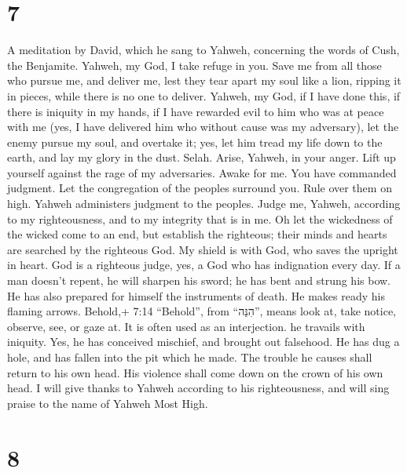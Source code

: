 \hypertarget{section-6}{%
\section{7}\label{section-6}}

A meditation by David, which he sang to Yahweh, concerning the words of
Cush, the Benjamite.  Yahweh, my God, I take refuge in you.
Save me from all those who pursue me, and deliver me,  lest
they tear apart my soul like a lion, ripping it in pieces, while there
is no one to deliver.  Yahweh, my God, if I have done this,
if there is iniquity in my hands,  if I have rewarded evil
to him who was at peace with me (yes, I have delivered him who without
cause was my adversary),  let the enemy pursue my soul, and
overtake it; yes, let him tread my life down to the earth, and lay my
glory in the dust. Selah.  Arise, Yahweh, in your anger.
Lift up yourself against the rage of my adversaries. Awake for me. You
have commanded judgment.  Let the congregation of the
peoples surround you. Rule over them on high.  Yahweh
administers judgment to the peoples. Judge me, Yahweh, according to my
righteousness, and to my integrity that is in me.  Oh let
the wickedness of the wicked come to an end, but establish the
righteous; their minds and hearts are searched by the righteous God.
 My shield is with God, who saves the upright in heart.
 God is a righteous judge, yes, a God who has indignation
every day.  If a man doesn't repent, he will sharpen his
sword; he has bent and strung his bow.  He has also
prepared for himself the instruments of death. He makes ready his
flaming arrows.  Behold,+ 7:14 ``Behold'', from ``הִנֵּה'',
means look at, take notice, observe, see, or gaze at. It is often used
as an interjection. he travails with iniquity. Yes, he has conceived
mischief, and brought out falsehood.  He has dug a hole,
and has fallen into the pit which he made.  The trouble he
causes shall return to his own head. His violence shall come down on the
crown of his own head.  I will give thanks to Yahweh
according to his righteousness, and will sing praise to the name of
Yahweh Most High.

\hypertarget{section-7}{%
\section{8}\label{section-7}}

